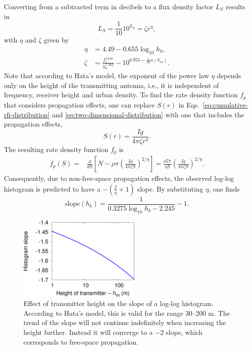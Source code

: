 \documentclass[useAMS,usenatbib]{mn2e}
\begin{document}
Converting from a subtracted term in decibels to a flux density factor $L_S$ results in
\begin{equation} \label{eq:propagation-loss-factor}
 L_S = \frac{1}{10} 10^{L_p} = \zeta r^\eta,
\end{equation}
with $\eta$ and $\zeta$ given by
\begin{align} 
 \label{eq:zeta-definition} \eta & = 4.49 - 0.655 \log_{10} h_b,\\
 \label{eq:eta-definition}  \zeta & = \frac{f_c^{2.616}}{h_b^{1.382}} - 10^{6.955-\frac{1}{10} a(h_m)}.
\end{align}
Note that according to Hata's model, the exponent of the power law $\eta$ depends only on the height of the transmitting antenna, i.e., it is independent of frequency, receiver height and urban density. To find the rate density function $f_p$ that considers propagation effects, one can replace $S(r)$ in Eqs.~\eqref{eq:cumulative-rfi-distribution} and \eqref{eq:two-dimensional-distribution} with one that includes the propagation effects,
\begin{equation}
 S(r) = \frac{Ig}{4\pi \zeta r^\eta}.
\end{equation}
The resulting rate density function $f_p$ is
\begin{align} \label{eq:frequency-density-with-propagation}
f_p(S)
= & \frac{d}{dS} \left[ N - \rho \pi \left( \frac{Ig }{4\pi\zeta S} \right)^{2/\eta} \right]
= \frac{\rho 2\pi}{\eta S} \left( \frac{Ig}{4\pi\zeta S} \right)^{2/\eta}.
\end{align}
Consequently, due to non-free-space propagation effects, the observed log-log histogram is predicted to have a $-(\frac{2}{\eta}+1)$ slope. By substituting $\eta$, one finds
\begin{equation}
\textrm{slope}(h_b) = \frac{1}{0.3275 \log_{10} h_b - 2.245} - 1.
\end{equation}
\begin{figure}
\begin{center}\hspace{-1cm}\includegraphics[width=6cm]{img/transmitter-height/plot-transmitter-height-trimmed}
\caption{Effect of transmitter height on the slope of a log-log histogram. According to Hata's model, this is valid for the range 30--200 m. The trend of the slope will not continue indefinitely when increasing the height further. Instead it will converge to a $-2$ slope, which corresponds to free-space propagation.}
\label{fig:plot-transmitter-height}
\end{center}
\end{figure}
\end{document}
